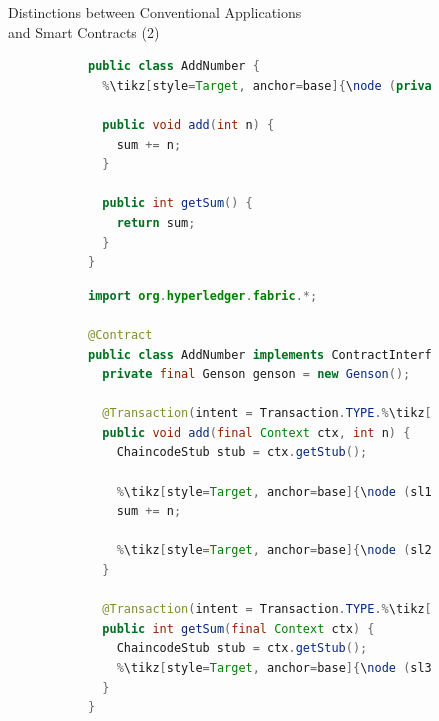 \documentclass[xcolor=svgnames]{beamer}
\begin{document}
\begin{frame}[fragile]{Distinctions between Conventional Applications\\ and Smart Contracts (2)}

\begin{figure}
\centering
\begin{subfigure}[T]{0.4\textwidth}
\begin{lstlisting}[language=java,basicstyle=\tiny, escapechar=\%,]
public class AddNumber {
  %\tikz[style=Target, anchor=base]{\node (private) {\color{blue}{\bfseries private}}}% int sum = 0;

  public void add(int n) {
    sum += n;
  }

  public int getSum() {
    return sum;
  }
}
\end{lstlisting}
\end{subfigure}
\hfill
\begin{subfigure}[T]{0.55\textwidth}
\begin{lstlisting}[language=java,basicstyle=\tiny, escapechar=\%,]
import org.hyperledger.fabric.*;

@Contract
public class AddNumber implements ContractInterface {
  private final Genson genson = new Genson();

  @Transaction(intent = Transaction.TYPE.%\tikz[style=Target, anchor=base]{\node (submit) {SUBMIT}}%)
  public void add(final Context ctx, int n) {
    ChaincodeStub stub = ctx.getStub();

    %\tikz[style=Target, anchor=base]{\node (sl1) {}}%int sum = Integer.parseInt(stub.getStringState("sum"));
    sum += n;

    %\tikz[style=Target, anchor=base]{\node (sl2) {}}%stub.putStringState("sum", String.valueOf(sum));
  }

  @Transaction(intent = Transaction.TYPE.%\tikz[style=Target, anchor=base]{\node (evaluate) {EVALUATE}}%)
  public int getSum(final Context ctx) {
    ChaincodeStub stub = ctx.getStub();
    %\tikz[style=Target, anchor=base]{\node (sl3) {}}%return Integer.parseInt(stub.getStringState("sum"));
  }
}
\end{lstlisting}
\end{subfigure}
\end{figure}


\end{frame}
\end{document}
